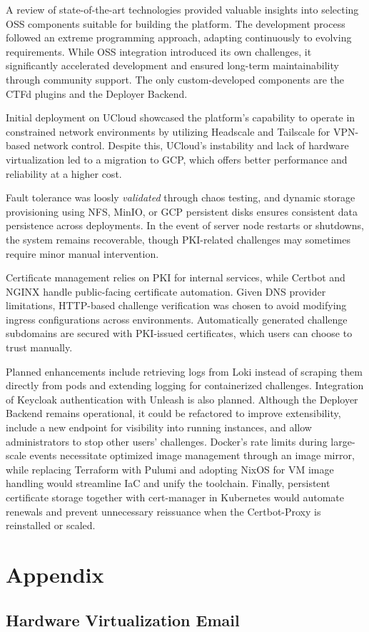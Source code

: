 A review of state-of-the-art technologies provided valuable insights into selecting OSS components suitable for building the platform. The development process followed an extreme programming approach, adapting continuously to evolving requirements. While OSS integration introduced its own challenges, it significantly accelerated development and ensured long-term maintainability through community support. The only custom-developed components are the CTFd plugins and the Deployer Backend.

Initial deployment on UCloud showcased the platform's capability to operate in constrained network environments by utilizing Headscale and Tailscale for VPN-based network control. Despite this, UCloud's instability and lack of hardware virtualization led to a migration to GCP, which offers better performance and reliability at a higher cost.

Fault tolerance was loosly \textit{validated} through chaos testing, and dynamic storage provisioning using NFS, MinIO, or GCP persistent disks ensures consistent data persistence across deployments. In the event of server node restarts or shutdowns, the system remains recoverable, though PKI-related challenges may sometimes require minor manual intervention.

Certificate management relies on PKI for internal services, while Certbot and NGINX handle public-facing certificate automation. Given DNS provider limitations, HTTP-based challenge verification was chosen to avoid modifying ingress configurations across environments. Automatically generated challenge subdomains are secured with PKI-issued certificates, which users can choose to trust manually.

Planned enhancements include retrieving logs from Loki instead of scraping them directly from pods and extending logging for containerized challenges. Integration of Keycloak authentication with Unleash is also planned. Although the Deployer Backend remains operational, it could be refactored to improve extensibility, include a new endpoint for visibility into running instances, and allow administrators to stop other users' challenges. Docker's rate limits during large-scale events necessitate optimized image management through an image mirror, while replacing Terraform with Pulumi and adopting NixOS for VM image handling would streamline IaC and unify the toolchain. Finally, persistent certificate storage together with cert-manager in Kubernetes would automate renewals and prevent unnecessary reissuance when the Certbot-Proxy is reinstalled or scaled.

\cleardoublepage
{}
{}
\printbibliography

\chapter*{Appendix}
\section*{Hardware Virtualization Email}\label{sec:hardware_virtualization_email}

